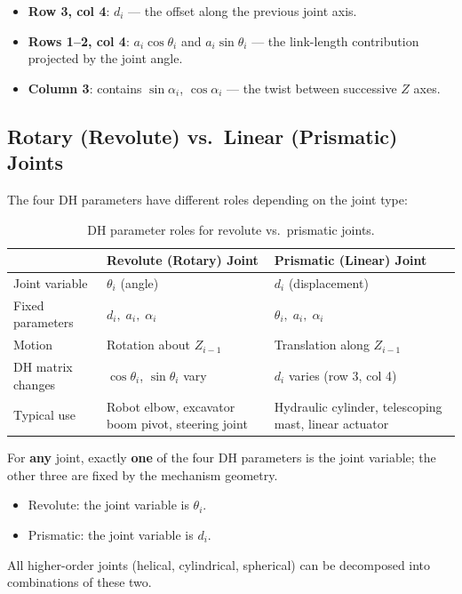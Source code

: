 \documentclass[12pt,a4paper]{article}
\begin{document}
\begin{keybox}
\begin{itemize}
  \item \textbf{Row 3, col 4}: $d_i$ --- the offset along the previous
        joint axis.
  \item \textbf{Rows 1--2, col 4}: $a_i\cos\theta_i$ and
        $a_i\sin\theta_i$ --- the link-length contribution projected
        by the joint angle.
  \item \textbf{Column 3}: contains $\sin\alpha_i$, $\cos\alpha_i$ ---
        the twist between successive $Z$ axes.
\end{itemize}
\end{keybox}

\subsection{Rotary (Revolute) vs.\ Linear (Prismatic) Joints}

The four DH parameters have different roles depending on the joint type:

\begin{table}[h]
\centering
\begin{tabular}{@{}p{3.2cm}p{5.5cm}p{5.5cm}@{}}
\toprule
 & \textbf{Revolute (Rotary) Joint} &
   \textbf{Prismatic (Linear) Joint} \\
\midrule
Joint variable &
  $\theta_i$ (angle) &
  $d_i$ (displacement) \\[4pt]
Fixed parameters &
  $d_i,\; a_i,\; \alpha_i$ &
  $\theta_i,\; a_i,\; \alpha_i$ \\[4pt]
Motion &
  Rotation about $Z_{i-1}$ &
  Translation along $Z_{i-1}$ \\[4pt]
DH matrix changes &
  $\cos\theta_i$, $\sin\theta_i$ vary &
  $d_i$ varies (row 3, col 4) \\[4pt]
Typical use &
  Robot elbow, excavator boom pivot,
  steering joint &
  Hydraulic cylinder, telescoping mast,
  linear actuator \\
\bottomrule
\end{tabular}
\caption{DH parameter roles for revolute vs.\ prismatic joints.}
\end{table}

\begin{warningbox}
For \textbf{any} joint, exactly \textbf{one} of the four DH parameters
is the joint variable; the other three are fixed by the mechanism
geometry.
\begin{itemize}
  \item Revolute: the joint variable is $\theta_i$.
  \item Prismatic: the joint variable is $d_i$.
\end{itemize}
All higher-order joints (helical, cylindrical, spherical) can be
decomposed into combinations of these two.
\end{warningbox}
\end{document}
